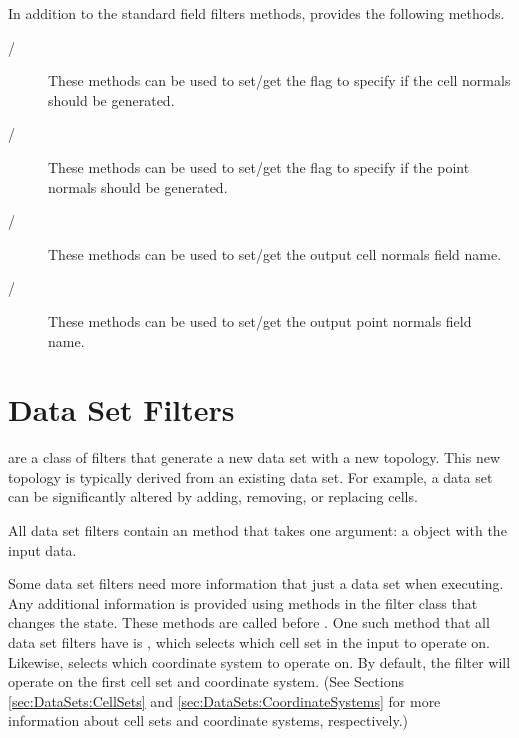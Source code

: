 In addition to the standard field filters methods,
 provides the following methods.

\begin{description}
\item[/]
  These methods can be used to set/get the flag to specify if the cell normals
  should be generated.
\item[/]
  These methods can be used to set/get the flag to specify if the point normals
  should be generated.
\item[/]
  These methods can be used to set/get the output cell normals field name.
\item[/]
  These methods can be used to set/get the output point normals field name.
\end{description}




\section{Data Set Filters}


 are a class of filters that generate a new data
set with a new topology. This new topology is typically derived from an
existing data set. For example, a data set can be significantly altered by
adding, removing, or replacing cells.

All data set filters contain an  method that takes one
argument: a  object with the input data.

Some data set filters need more information that just a data set when
executing. Any additional information is provided using methods in the
filter class that changes the state. These methods are called before
. One such method that all data set filters have is
, which selects which cell set in the input
 to operate on. Likewise,
 selects which coordinate system to
operate on. By default, the filter will operate on the first cell set and
coordinate system. (See Sections \ref{sec:DataSets:CellSets} and
\ref{sec:DataSets:CoordinateSystems} for more information about cell sets
and coordinate systems, respectively.)

